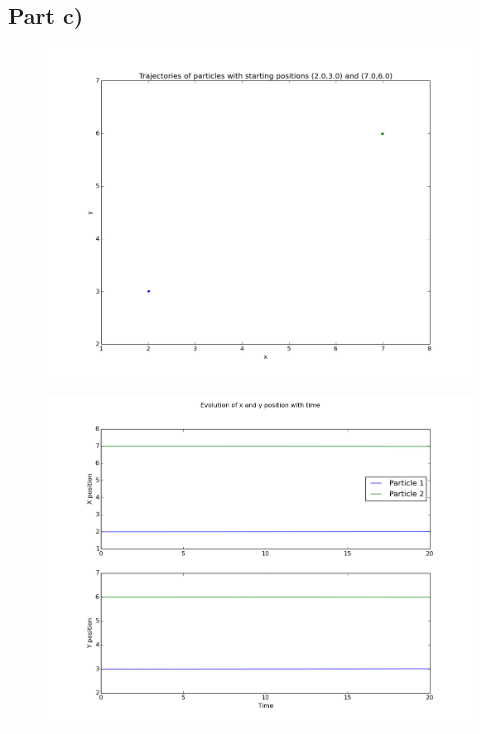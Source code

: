 \documentclass[a4paper,12pt]{article}
\begin{document}
\subsection{Part c)}

\begin{figure}[H]
\centering
\includegraphics[width = \linewidth]{lab6q5c.png}
\caption{}
\label{fig:q5c}
\end{figure}

\begin{figure}[H]
\centering
\includegraphics[width = \linewidth]{lab6q5ci.png}
\caption{}
\label{fig:q5ci}
\end{figure}
\end{document}
